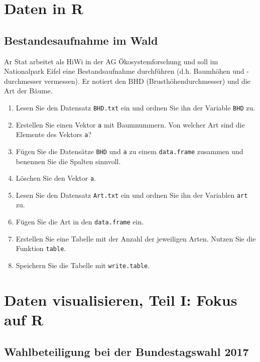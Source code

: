 \documentclass[]{book}
\providecommand{\tightlist}{%
  \setlength{\itemsep}{0pt}\setlength{\parskip}{0pt}}
\begin{document}
\hypertarget{daten-in-r}{%
\section{Daten in R}\label{daten-in-r}}

\hypertarget{bestandesaufnahme}{%
\subsection{Bestandesaufnahme im Wald}\label{bestandesaufnahme}}

Ar Stat arbeitet als HiWi in der AG Ökosystemforschung und soll im Nationalpark Eifel eine Bestandsaufnahme durchführen (d.h. Baumhöhen und -durchmesser vermessen). Er notiert den BHD (Brusthöhendurchmesser) und die Art der Bäume.

\begin{enumerate}
\def\labelenumi{\arabic{enumi}.}
\tightlist
\item
  Lesen Sie den Datensatz \texttt{BHD.txt} ein und ordnen Sie ihn der Variable \texttt{BHD} zu.
\item
  Erstellen Sie einen Vektor \texttt{a} mit Baumnummern. Von welcher Art sind die Elemente des Vektors \texttt{a}?
\item
  Fügen Sie die Datensätze \texttt{BHD} und \texttt{a} zu einem \texttt{data.frame} zusammen und benennen Sie die Spalten sinnvoll.
\item
  Löschen Sie den Vektor \texttt{a}.
\item
  Lesen Sie den Datensatz \texttt{Art.txt} ein und ordnen Sie ihn der Variablen \texttt{art} zu.
\item
  Fügen Sie die Art in den \texttt{data.frame} ein.
\item
  Erstellen Sie eine Tabelle mit der Anzahl der jeweiligen Arten. Nutzen Sie die Funktion \texttt{table}.
\item
  Speichern Sie die Tabelle mit \texttt{write.table}.
\end{enumerate}

\hypertarget{daten-visualisieren-teil-i-fokus-auf-r}{%
\section{Daten visualisieren, Teil I: Fokus auf R}\label{daten-visualisieren-teil-i-fokus-auf-r}}

\hypertarget{wahlbeteiligung}{%
\subsection{Wahlbeteiligung bei der Bundestagswahl 2017}\label{wahlbeteiligung}}
\end{document}
